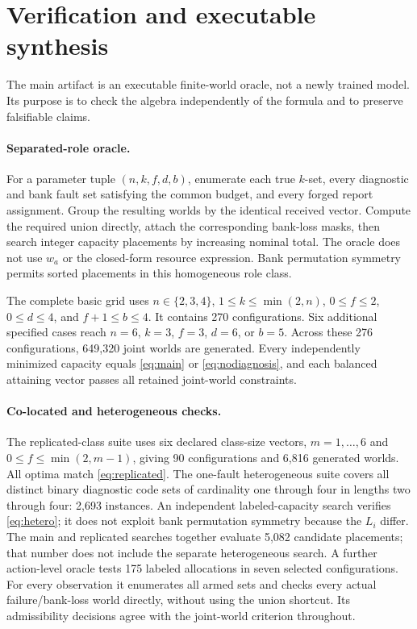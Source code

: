 \documentclass[11pt,a4paper]{article}
\theoremstyle{definition}\newtheorem{definition}{Definition}
\begin{document}
\section{Verification and executable synthesis}
\label{sec:verification}
The main artifact is an executable finite-world oracle, not a newly trained model. Its purpose is to check the algebra independently of the formula and to preserve falsifiable claims.

\paragraph{Separated-role oracle.}
For a parameter tuple $(n,k,f,d,b)$, enumerate each true $k$-set, every diagnostic and bank fault set satisfying the common budget, and every forged report assignment. Group the resulting worlds by the identical received vector. Compute the required union directly, attach the corresponding bank-loss masks, then search integer capacity placements by increasing nominal total. The oracle does not use $w_a$ or the closed-form resource expression. Bank permutation symmetry permits sorted placements in this homogeneous role class.

The complete basic grid uses $n\in\{2,3,4\}$, $1\leq k\leq\min(2,n)$, $0\leq f\leq2$, $0\leq d\leq4$, and $f+1\leq b\leq4$. It contains 270 configurations. Six additional specified cases reach $n=6$, $k=3$, $f=3$, $d=6$, or $b=5$. Across these 276 configurations, 649,320 joint worlds are generated. Every independently minimized capacity equals \cref{eq:main} or \cref{eq:nodiagnosis}, and each balanced attaining vector passes all retained joint-world constraints.

\paragraph{Co-located and heterogeneous checks.}
The replicated-class suite uses six declared class-size vectors, $m=1,\ldots,6$ and $0\leq f\leq\min(2,m-1)$, giving 90 configurations and 6,816 generated worlds. All optima match \cref{eq:replicated}. The one-fault heterogeneous suite covers all distinct binary diagnostic code sets of cardinality one through four in lengths two through four: 2,693 instances. An independent labeled-capacity search verifies \cref{eq:hetero}; it does not exploit bank permutation symmetry because the $L_i$ differ. The main and replicated searches together evaluate 5,082 candidate placements; that number does not include the separate heterogeneous search. A further action-level oracle tests 175 labeled allocations in seven selected configurations. For every observation it enumerates all armed sets and checks every actual failure/bank-loss world directly, without using the union shortcut. Its admissibility decisions agree with the joint-world criterion throughout.
\end{document}
